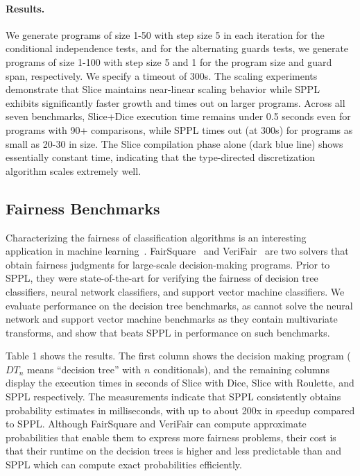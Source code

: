 

\paragraph{Results.} We generate programs of size 1-50 with step size 5 in each iteration for the conditional independence tests, and for the alternating guards tests, we generate programs of size 1-100 with step size 5 and 1 for the program size and guard span, respectively. We specify a timeout of 300s. The scaling experiments demonstrate that Slice maintains near-linear scaling behavior while SPPL exhibits significantly faster growth and times out on larger programs. Across all seven benchmarks, Slice+Dice execution time remains under 0.5 seconds even for programs with 90+ comparisons, while SPPL times out (at 300s) for programs as small as 20-30 in size. The Slice compilation phase alone (dark blue line) shows essentially constant time, indicating that the type-directed discretization algorithm scales extremely well.

\subsection{Fairness Benchmarks}
Characterizing the fairness of classification algorithms is an interesting application in machine learning~\cite{Dwork2012FairnessAwareness}. FairSquare~\cite{albarghouthi2017fairsquare} and VeriFair~\cite{Bastani2019VeriFair} are two solvers that obtain fairness judgments for large-scale decision-making programs. Prior to SPPL, they were state-of-the-art for verifying the fairness of decision tree classifiers, neural network classifiers, and support vector machine classifiers. We evaluate performance on the decision tree benchmarks, as \Slice cannot solve the neural network and support vector machine benchmarks as they contain multivariate transforms, and show that \Slice{} beats SPPL in performance on such benchmarks.

Table 1 shows the results. The first column shows the decision making program ($DT_n$ means ``decision tree'' with $n$ conditionals), and the remaining columns display the execution times in seconds of Slice with Dice, Slice with Roulette, and SPPL respectively. The measurements indicate that SPPL consistently obtains probability estimates in milliseconds, with up to about 200x in speedup compared to SPPL. Although FairSquare and VeriFair can compute approximate probabilities that enable them to express more fairness problems, their cost is that their runtime on the decision trees is higher and less predictable than \Slice{} and SPPL which can compute exact probabilities efficiently.

